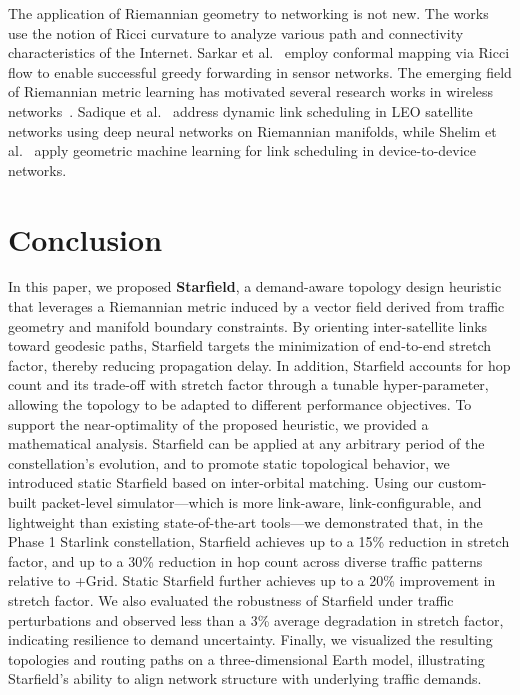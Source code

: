 \documentclass[acmsmall, screen]{acmart}
\begin{document}
The application of Riemannian geometry to networking is not new. The works~\cite{ni2015ricci, salamatian2022curvature} use the notion of Ricci curvature to analyze various path and connectivity characteristics of the Internet. Sarkar et al.~\cite{sarkar2009greedy} employ conformal mapping via Ricci flow to enable successful greedy forwarding in sensor networks. The emerging field of Riemannian metric learning has motivated several research works in wireless networks~\cite{gruffaz2025riemannian, qin2025pr}. Sadique et al.~\cite{sadique2025link} address dynamic link scheduling in LEO satellite networks using deep neural networks on Riemannian manifolds, while Shelim et al.~\cite{shelim2022geometric} apply geometric machine learning for link scheduling in device-to-device networks.

\section{Conclusion}\label{conclusion}
In this paper, we proposed \textbf{Starfield}, a demand-aware topology design heuristic that leverages a Riemannian metric induced by a vector field derived from traffic geometry and manifold boundary constraints. By orienting inter-satellite links toward geodesic paths, Starfield targets the minimization of end-to-end stretch factor, thereby reducing propagation delay. In addition, Starfield accounts for hop count and its trade-off with stretch factor through a tunable hyper-parameter, allowing the topology to be adapted to different performance objectives. To support the near-optimality of the proposed heuristic, we provided a mathematical analysis. Starfield can be applied at any arbitrary period of the constellation’s evolution, and to promote static topological behavior, we introduced static Starfield based on inter-orbital matching. Using our custom-built packet-level simulator—which is more link-aware, link-configurable, and lightweight than existing state-of-the-art tools—we demonstrated that, in the Phase 1 Starlink constellation, Starfield achieves up to a 15\% reduction in stretch factor, and up to a 30\% reduction in hop count across diverse traffic patterns relative to +Grid. Static Starfield further achieves up to a 20\% improvement in stretch factor. We also evaluated the robustness of Starfield under traffic perturbations and observed less than a 3\% average degradation in stretch factor, indicating resilience to demand uncertainty. Finally, we visualized the resulting topologies and routing paths on a three-dimensional Earth model, illustrating Starfield’s ability to align network structure with underlying traffic demands.
\end{document}
